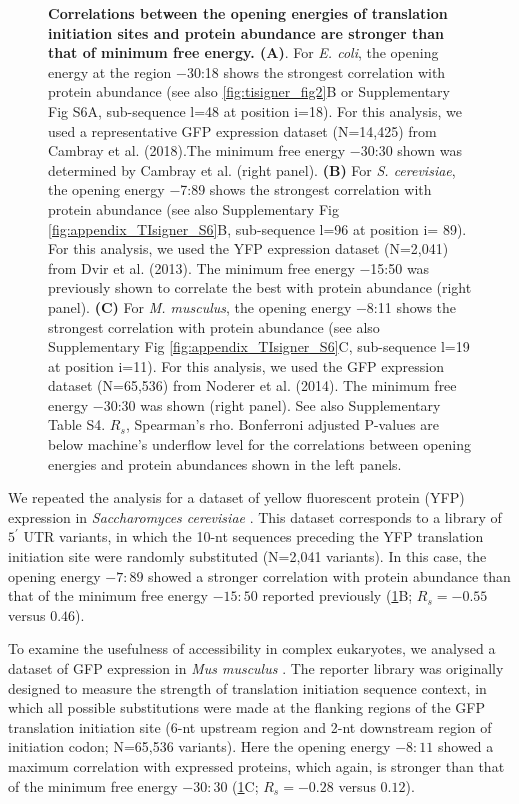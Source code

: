\begin{figure}
\caption[Correlations between the opening energies of translation initiation sites and protein abundance are stronger than that of minimum free energy.]{\textbf{Correlations between the opening energies of translation initiation sites and protein abundance are stronger than that of minimum free energy. (A)}. For \textit{E. coli}, the opening energy at the region −30:18 shows the strongest correlation with protein abundance (see also \ref{fig:tisigner_fig2}B or Supplementary Fig S6A, sub-sequence l=48 at position i=18). For this analysis, we used a representative GFP expression dataset (N=14,425) from Cambray et al. (2018).The minimum free energy −30:30 shown was determined by Cambray et al. (right panel). \textbf{(B)}  For \textit{S. cerevisiae}, the opening energy −7:89 shows the strongest correlation with protein abundance (see also Supplementary Fig \ref{fig:appendix_TIsigner_S6}B, sub-sequence l=96 at position i= 89). For this analysis, we used the YFP expression dataset (N=2,041) from Dvir et al. (2013). The minimum free energy −15:50 was previously shown to correlate the best with protein abundance (right panel). \textbf{(C)} For \textit{M. musculus}, the opening energy −8:11 shows the strongest correlation with protein abundance (see also Supplementary Fig \ref{fig:appendix_TIsigner_S6}C, sub-sequence l=19 at position i=11). For this analysis, we used the GFP expression dataset (N=65,536) from Noderer et al. (2014). The minimum free energy −30:30 was shown (right panel). See also Supplementary Table S4. $R_s$, Spearman’s rho. Bonferroni adjusted P-values are below machine’s underflow level for the correlations between opening energies and protein abundances shown in the left panels.}
\label{fig:tisigner_fig1}
\end{figure}


We repeated the analysis for a dataset of yellow fluorescent protein (YFP) expression in \textit{Saccharomyces cerevisiae} \cite{Dvir2013-lq}. This dataset corresponds to a library of $5^{\prime}$ UTR variants, in which the 10-nt sequences preceding the YFP translation initiation site were randomly substituted (N=2,041 variants). In this case, the opening energy $−7:89$ showed a stronger correlation with protein abundance than that of the minimum free energy $−15:50$ reported previously (\ref{fig:tisigner_fig1}B; $R_s=−0.55$ versus $0.46$).

To examine the usefulness of accessibility in complex eukaryotes, we analysed a dataset of GFP expression in \textit{Mus musculus} \cite{Noderer2014-ve}. The reporter library was originally designed to measure the strength of translation initiation sequence context, in which all possible substitutions were made at the flanking regions of the GFP translation initiation site (6-nt upstream region and 2-nt downstream region of initiation codon; N=65,536 variants). Here the opening energy $−8:11$ showed a maximum correlation with expressed proteins, which again, is stronger than that of the minimum free energy $−30:30$ (\ref{fig:tisigner_fig1}C; $R_s=−0.28$ versus $0.12$). 


